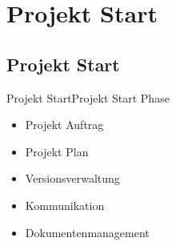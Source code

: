 \section{Projekt Start}
\subsection{Projekt Start}
\begin{frame}{Projekt Start}{Projekt Start Phase}
  \begin{itemize}
    \item Projekt Auftrag
    \item Projekt Plan
    \item Versionsverwaltung
    \item Kommunikation
    \item Dokumentenmanagement
  \end{itemize}
\end{frame}

